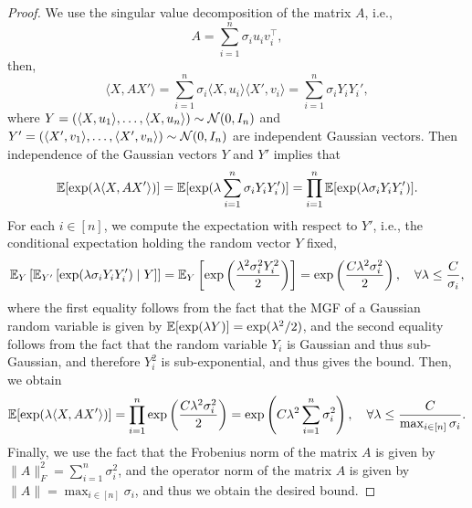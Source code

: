 \begin{proof}
	We use the singular value decomposition of the matrix \(A\), i.e.,
	\begin{equation*}
		A=\sum_{i=1}^{n}\sigma_{i}u_{i}v_{i}^{\top},
	\end{equation*}
	then,
	\begin{equation*}
		\langle X, AX'\rangle=\sum_{i=1}^{n}\sigma_{i}\langle X, u_{i}\rangle\langle X', v_{i}\rangle=\sum_{i=1}^{n}\sigma_{i}Y_{i}Y_{i}',
	\end{equation*}
	where \(Y=(\langle X, u_{1}\rangle,\ldots, \langle X, u_{n}\rangle)\sim{\mathcal N}(0, I_{n})\) and \(Y'=(\langle X', v_{1}\rangle,\ldots, \langle X', v_{n}\rangle)\sim{\mathcal N}(0, I_{n})\) are independent Gaussian vectors. Then independence of the Gaussian vectors \(Y\) and \(Y'\) implies that
	\begin{equation*}
		{\mathbb E}[\exp(\lambda\langle X, AX'\rangle)]={\mathbb E}[\exp(\lambda\sum_{i=1}^{n}\sigma_{i}Y_{i}Y_{i}')]=\prod_{i=1}^{n}{\mathbb E}[\exp(\lambda\sigma_{i}Y_{i}Y_{i}')].
	\end{equation*}
	For each \(i\in[n]\), we compute the expectation with respect to \(Y'\), i.e., the conditional expectation holding the random vector \(Y\) fixed,
	\begin{equation*}
		{\mathbb E}_{Y}\left[{\mathbb E}_{Y'}\left[\exp(\lambda\sigma_{i}Y_{i}Y_{i}')\mid Y\right]\right]={\mathbb E}_{Y}\left[\exp\left(\frac{\lambda^{2}\sigma_{i}^{2}Y_{i}^{2}}{2}\right)\right]=\exp\left(\frac{C\lambda^{2}\sigma_{i}^{2}}{2}\right),\quad \forall\lambda\leq\frac{C}{\sigma_{i}},
	\end{equation*}
	where the first equality follows from the fact that the MGF of a Gaussian random variable is given by \({\mathbb E}[\exp(\lambda Y)]=\exp(\lambda^{2}/2)\), and the second equality follows from the fact that the random variable \(Y_{i}\) is Gaussian and thus sub-Gaussian, and therefore \(Y_{i}^{2}\) is sub-exponential, and thus gives the bound. Then, we obtain
	\begin{equation*}
		{\mathbb E}[\exp(\lambda\langle X, AX'\rangle)]=\prod_{i=1}^{n}\exp\left(\frac{C\lambda^{2}\sigma_{i}^{2}}{2}\right)=\exp\left(C\lambda^{2}\sum_{i=1}^{n}\sigma_{i}^{2}\right),\quad\forall\lambda\leq\frac{C}{\max_{i\in[n]}\sigma_{i}}.
	\end{equation*}
	Finally, we use the fact that the Frobenius norm of the matrix \(A\) is given by \(\|A\|_{F}^{2}=\sum_{i=1}^{n}\sigma_{i}^{2}\), and the operator norm of the matrix \(A\) is given by \(\|A\|=\max_{i\in[n]}\sigma_{i}\), and thus we obtain the desired bound.
\end{proof}

